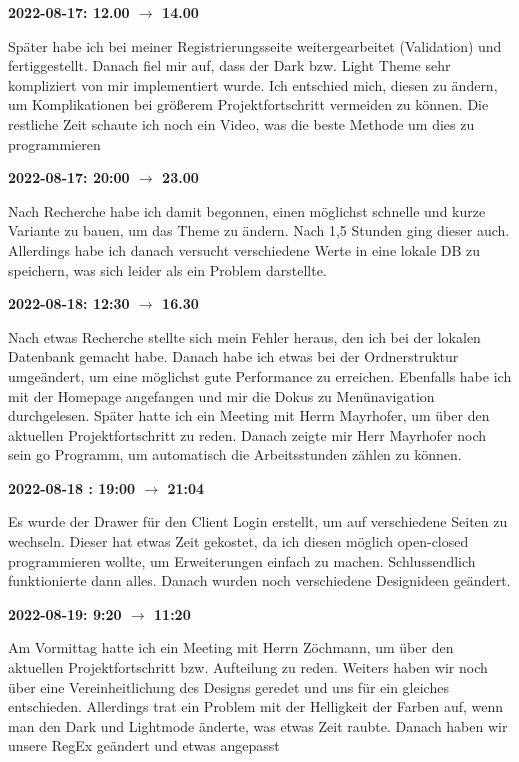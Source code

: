 \vspace{0.5cm} \textbf{2022-08-17: 12.00 $\rightarrow$ 14.00}

Sp\"ater habe ich bei meiner Registrierungsseite weitergearbeitet
(Validation) und fertiggestellt. Danach fiel mir auf, dass der Dark bzw.
Light Theme sehr kompliziert von mir implementiert wurde. Ich entschied
mich, diesen zu ändern, um Komplikationen bei größerem
Projektfortschritt vermeiden zu können. Die restliche Zeit schaute ich
noch ein Video, was die beste Methode um dies zu programmieren

\vspace{0.5cm} \textbf{2022-08-17: 20:00 $\rightarrow$ 23.00}

Nach Recherche habe ich damit begonnen, einen möglichst schnelle und kurze
Variante zu bauen, um das Theme zu ändern. Nach 1,5 Stunden ging dieser
auch. Allerdings habe ich danach versucht verschiedene Werte in eine
lokale DB zu speichern, was sich leider als ein Problem darstellte.

\vspace{0.5cm} \textbf{2022-08-18: 12:30 $\rightarrow$ 16.30}

Nach etwas Recherche stellte sich mein Fehler heraus, den ich bei der
lokalen Datenbank gemacht habe. Danach habe ich etwas bei der
Ordnerstruktur umgeändert, um eine möglichst gute Performance zu
erreichen. Ebenfalls habe ich mit der Homepage angefangen und mir die
Dokus zu Menünavigation durchgelesen. Später hatte ich ein Meeting mit
Herrn Mayrhofer, um über den aktuellen Projektfortschritt zu reden.
Danach zeigte mir Herr Mayrhofer noch sein go Programm, um automatisch
die Arbeitsstunden zählen zu können.

\vspace{0.5cm} \textbf{2022-08-18 : 19:00 $\rightarrow$ 21:04}

Es wurde der Drawer für den Client Login erstellt, um auf verschiedene
Seiten zu wechseln. Dieser hat etwas Zeit gekostet, da ich diesen
möglich open-closed programmieren wollte, um Erweiterungen einfach
zu machen. Schlussendlich funktionierte dann alles. Danach wurden noch
verschiedene Designideen geändert.

\vspace{0.5cm} \textbf{2022-08-19: 9:20 $\rightarrow$ 11:20}

Am Vormittag hatte ich ein Meeting mit Herrn Zöchmann, um über den
aktuellen Projektfortschritt bzw. Aufteilung zu reden. Weiters haben wir
noch über eine Vereinheitlichung des Designs geredet und uns für ein
gleiches entschieden. Allerdings trat ein Problem mit der Helligkeit der
Farben auf, wenn man den Dark und Lightmode änderte, was etwas Zeit
raubte. Danach haben wir unsere RegEx geändert und etwas angepasst

